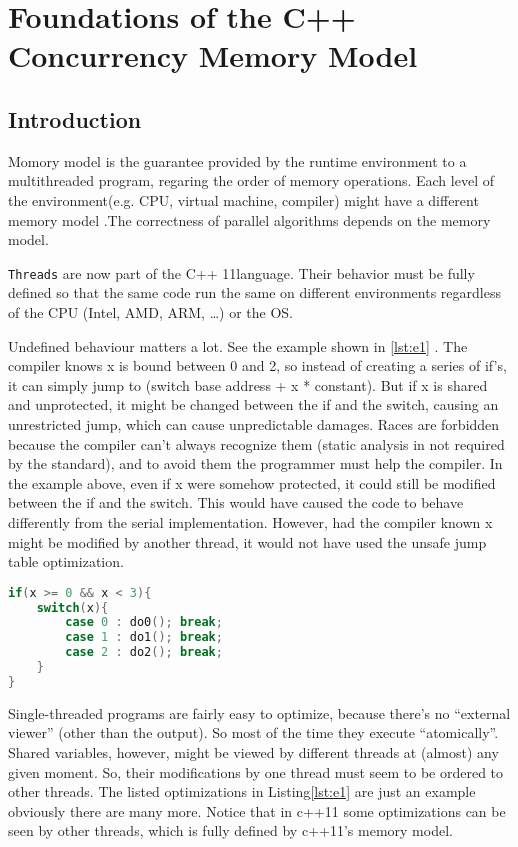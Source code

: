 \newpage
\section{Foundations of the C++ Concurrency Memory Model\cite{PPTTheC19:online,boehm2008foundations}}


\subsection{Introduction\cite{TheC11Me27:online}}

Momory model is the guarantee provided by the runtime environment to a 
multithreaded program, regaring the order of memory operations. 
Each level of the environment(e.g. CPU, virtual machine, compiler) might have a different memory model
.The 
correctness of parallel algorithms depends on the memory model.


\texttt{Threads}  are now part of the C++ 11language.
Their behavior must be fully defined so that the same code
 run the same on different environments regardless of the CPU
  (Intel, AMD, ARM, …) or the OS.




Undefined behaviour matters a lot. See the example shown in \ref{lst:e1} . 
The compiler knows x is bound between 0 and 2, so instead of 
creating a series of if’s, it can simply jump to 
(switch base address + x * constant). 
But if x is shared and unprotected, it might be changed 
between the if and the switch, causing an unrestricted jump,
 which can cause unpredictable damages.
Races are forbidden because the compiler can’t always recognize them (static analysis in not required by the standard), 
and to avoid them the programmer must help the compiler.
In the example above, even if x were somehow protected, it could still be modified between the if and the switch. 
This would have caused the code to behave differently from the serial implementation. 
However, had the compiler known x might be modified by another thread, 
it would not have used the unsafe jump table optimization.


\begin{lstlisting}[language=C,frame=single, caption=An simple example  ,label = lst:e1]
if(x >= 0 && x < 3){
    switch(x){
        case 0 : do0(); break;
        case 1 : do1(); break;
        case 2 : do2(); break;
    }
}
\end{lstlisting}


Single-threaded programs are fairly easy to optimize, because there’s no “external viewer” (other than the output). 
So most of the time they execute “atomically”. Shared variables, however, might be viewed by different threads at 
(almost) any given moment. So, their modifications by one thread must seem to be ordered to other threads.
The listed optimizations in Listing\ref{lst:e1}  are just an example  obviously there are many more.
Notice that in c++11 some optimizations can be seen by other threads, which is fully defined by c++11’s memory model.


